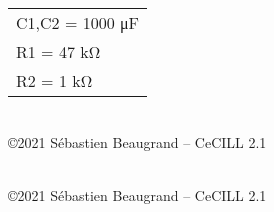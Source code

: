 \documentclass{kicad}
\begin{document}
\begin{center}
~\\
~\\
\\
~\\
~\\
\begin{tabular}{l}
C1,C2 = 1000 \si{\micro\farad}\\
R1 = 47 \si{\kilo\ohm}\\
R2 = 1 \si{\kilo\ohm}\\
\end{tabular}
\\
\vfill
\scriptsize
\copyright 2021 Sébastien Beaugrand -- CeCILL 2.1
\end{center}
\newpage
\vspace*{8cm}
\begin{center}
\\
\vfill
\scriptsize
\copyright 2021 Sébastien Beaugrand -- CeCILL 2.1
\end{center}
\end{document}
